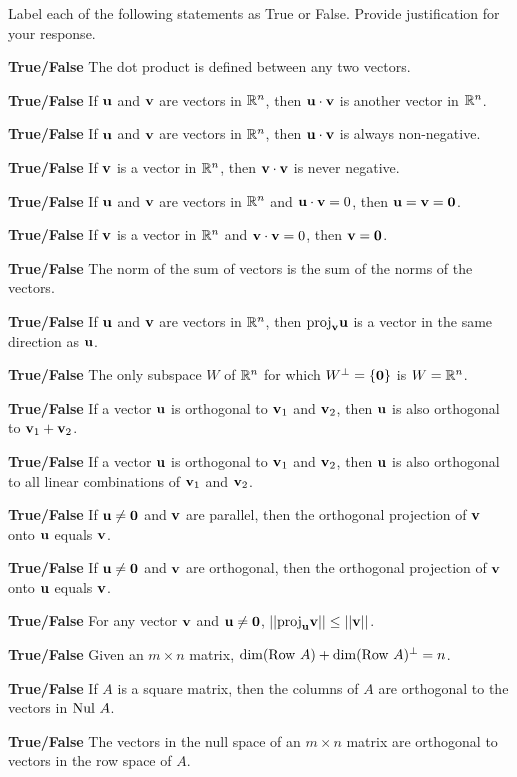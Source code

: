 \item Label each of the following statements as True or False. Provide justification for your response.
	\ba
	\item \textbf{True/False} The dot product is defined between any two vectors. 
	\item \textbf{True/False} If $\mathbf{u}$ and $\mathbf{v}$ are vectors in $\mathbb{R}^n$, then $\mathbf{u} \cdot \mathbf{v}$ is another vector in $\mathbb{R}^n$. 
	\item \textbf{True/False} If $\mathbf{u}$ and $\mathbf{v}$ are vectors in $\mathbb{R}^n$, then $\mathbf{u} \cdot \mathbf{v}$ is always non-negative.
	\item \textbf{True/False} If $\mathbf{v}$ is a vector in $\mathbb{R}^n$, then $\mathbf{v} \cdot \mathbf{v}$ is never negative.
	\item \textbf{True/False} If $\mathbf{u}$ and $\mathbf{v}$ are vectors in $\mathbb{R}^n$ and $\mathbf{u} \cdot \mathbf{v} = 0$, then $\mathbf{u} = \mathbf{v} = \mathbf{0}$. 
	\item \textbf{True/False} If $\mathbf{v}$ is a vector in $\mathbb{R}^n$ and $\mathbf{v} \cdot \mathbf{v} = 0$, then $\mathbf{v} = \mathbf{0}$. 
	\item \textbf{True/False} The norm of the sum of vectors is the sum of the norms of the vectors. 
	\item \textbf{True/False} If $\mathbf{u}$ and $\mathbf{v}$ are vectors in $\mathbb{R}^n$, then $\text{proj}_{\mathbf{v}} \mathbf{u}$ is a vector in the same direction as $\mathbf{u}$. 
	\item \textbf{True/False} The only subspace $W$ of $\mathbb{R}^n$ for which $W^\perp=\{\mathbf{0}\}$ is $W=\mathbb{R}^n$.
	\item \textbf{True/False} If a vector $\mathbf{u}$ is orthogonal to $\mathbf{v}_1$ and $\mathbf{v}_2$, then $\mathbf{u}$ is also orthogonal to $\mathbf{v}_1+\mathbf{v}_2$.
	\item \textbf{True/False} If a vector $\mathbf{u}$ is orthogonal to $\mathbf{v}_1$ and $\mathbf{v}_2$, then $\mathbf{u}$ is also orthogonal to all linear combinations of $\mathbf{v}_1$ and $\mathbf{v}_2$.
	\item \textbf{True/False} If $\mathbf{u}\neq \mathbf{0}$ and $\mathbf{v}$ are parallel, then the orthogonal projection of $\mathbf{v}$ onto $\mathbf{u}$ equals $\mathbf{v}$.
	\item \textbf{True/False} If $\mathbf{u}\neq \mathbf{0}$ and $\mathbf{v}$ are orthogonal, then the orthogonal projection of $\mathbf{v}$ onto $\mathbf{u}$ equals $\mathbf{v}$.
	\item \textbf{True/False}	For any vector $\mathbf{v}$ and $\mathbf{u}\neq \mathbf{0}$, $||\text{proj}_{\mathbf{u}} \mathbf{v}|| \leq ||\mathbf{v}||$.
	\item \textbf{True/False}	Given an $m\times n$ matrix, $\dim(\text{Row } A)+\dim(\text{Row } A)^\perp = n$.
	\item \textbf{True/False} If $A$ is a square matrix, then the columns of $A$ are orthogonal to the vectors in $\text{Nul } A$. 
	\item \textbf{True/False} The vectors in the null space of an $m \times n$ matrix are orthogonal to vectors in the row space of $A$. 

